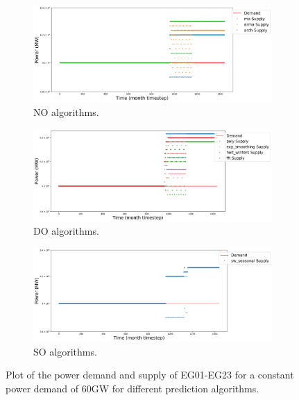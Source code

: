 \documentclass[11pt,letterpaper]{article}
\begin{document}
\begin{figure}[!htbp]
	\centering
	\begin{subfigure}[t]{.95\textwidth}
		\centering
		\includegraphics[width=\linewidth]{23-power-bufferB20001.png} 
		\caption{NO algorithms.}
		\label{fig:23powerNO}
	\end{subfigure}
	\vspace{.9cm}
	\begin{subfigure}[t]{.95\textwidth}
		\centering
		\includegraphics[width=\linewidth]{23-power-bufferB20002.png} 
		\caption{DO algorithms.}
		\label{fig:23powerDO}
	\end{subfigure}
	\vspace{.1cm}
	\begin{subfigure}[t]{.95\textwidth}
		\centering
		\includegraphics[width=\linewidth]{23-power-bufferB20003.png} 
		\caption{SO algorithms.}
		\label{fig:23powerSO}
	\end{subfigure}
	\hfill
	\caption{Plot of the power demand and supply of EG01-EG23 for a constant power demand of 60GW for different prediction algorithms.}
	\label{fig:23power}
\end{figure}
\end{document}

